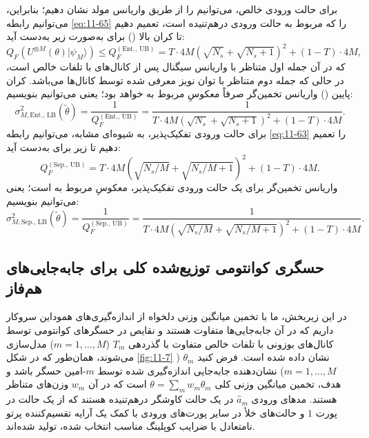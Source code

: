 برای حالت ورودی خالص، می‌توانیم  را از طریق واریانس مولد نشان دهیم؛ بنابراین، می‌توانیم رابطه \eqref{eq:11-65} را که مربوط به حالت ورودی درهم‌تنیده است، تعمیم دهیم تا کران بالا () برای  به‌صورت زیر به‌دست آید:
\begin{equation}
	Q_F(U^{\otimes M}(\theta)|\psi_M\rangle) \leq Q_F^{(\text{Ent., UB})} = T \cdot 4M(\sqrt{N_s} + \sqrt{N_s + 1})^2 + (1 - T) \cdot 4M,
	\label{eq:11-72}
\end{equation}
که در آن جمله اول متناظر با واریانس سیگنال پس از کانال‌های با تلفات خالص است، در حالی که جمله دوم متناظر با توان نویز معرفی شده توسط کانال‌ها می‌باشد. کران پایین () واریانس تخمین‌گر صرفاً معکوسِ  مربوط به  خواهد بود؛ یعنی می‌توانیم بنویسیم:
\begin{equation}
	\sigma_{M, \text{Ent., LB}}^2(\tilde{\theta}) = \frac{1}{Q_F^{(\text{Ent., UB})}} = \frac{1}{T \cdot 4M(\sqrt{N_s} + \sqrt{N_s + 1})^2 + (1 - T) \cdot 4M}.
	\label{eq:11-73}
\end{equation}
برای حالت ورودی تفکیک‌پذیر، به شیوه‌ای مشابه، می‌توانیم رابطه \eqref{eq:11-63} را تعمیم دهیم تا  زیر برای  به‌دست آید:
\begin{equation}
	Q_F^{(\text{Sep., UB})} = T \cdot 4M(\sqrt{N_s/M} + \sqrt{N_s/M + 1})^2 + (1 - T) \cdot 4M.
	\label{eq:11-74}
\end{equation}
 واریانس تخمین‌گر برای یک حالت ورودی تفکیک‌پذیر، معکوسِ  مربوط به  است؛ یعنی می‌توانیم بنویسیم:
\begin{equation}
	\sigma_{M, \text{Sep., LB}}^2(\tilde{\theta}) = \frac{1}{Q_F^{(\text{Sep., UB})}} = \frac{1}{T \cdot 4M(\sqrt{N_s/M} + \sqrt{N_s/M + 1})^2 + (1 - T) \cdot 4M}.
	\label{eq:11-75}
\end{equation}

\subsection{حسگری کوانتومی توزیع‌شده کلی برای جابه‌جایی‌های هم‌فاز}
\label{subsec:11-3-2}
در این زیربخش، ما با تخمین میانگین وزنی دلخواه از اندازه‌گیری‌های هموداین سروکار داریم که در آن جابه‌جایی‌ها متفاوت هستند و نقایص در حسگرهای کوانتومی توسط کانال‌های بوزونی با تلفات خالص متفاوت با گذردهی $T_m$ ($m = 1, \dots, M$) مدل‌سازی می‌شوند، همان‌طور که در شکل \ref{fig:11-7} نشان داده شده است. فرض کنید $\theta_m$ ($m = 1, \dots, M$) نشان‌دهنده جابه‌جایی اندازه‌گیری شده توسط $m$-امین حسگر باشد و هدف، تخمین میانگین وزنی کلی $\theta = \sum_m w_m \theta_m$ است که در آن $w_m$ وزن‌های متناظر هستند. مدهای ورودی $\hat{a}_m$ در یک حالت کاوشگر درهم‌تنیده هستند که از یک حالت  در پورت $1$ و حالت‌های خلأ در سایر پورت‌های ورودی با کمک یک آرایه تقسیم‌کننده پرتو نامتعادل با ضرایب کوپلینگ مناسب انتخاب شده، تولید شده‌اند.

